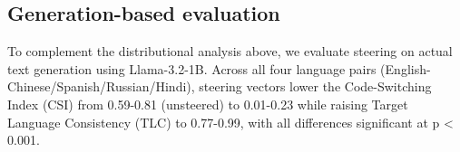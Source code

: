 \documentclass{article}
\begin{document}
\subsection{Generation-based evaluation}
\label{sec:generation_eval}

To complement the distributional analysis above, we evaluate steering on actual text generation using Llama-3.2-1B. Across all four language pairs (English-Chinese/Spanish/Russian/Hindi), steering vectors lower the Code-Switching Index (CSI) from 0.59-0.81 (unsteered) to 0.01-0.23 while raising Target Language Consistency (TLC) to 0.77-0.99, with all differences significant at p < 0.001.






%
\end{document}
